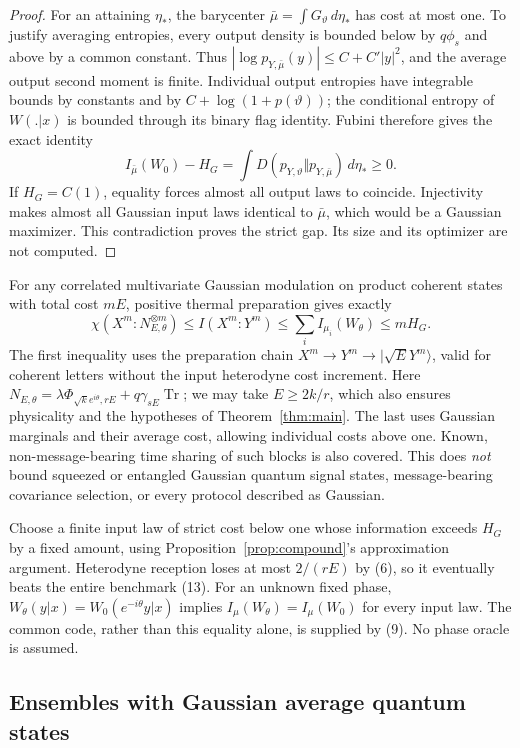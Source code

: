 \documentclass[11pt]{article}
\newcommand{\Tr}{\operatorname{Tr}}
\begin{document}
\begin{proof}
For an attaining \(\eta_*\), the barycenter
\(\bar\mu=\int G_\vartheta\,d\eta_*\) has cost at most one.
To justify averaging entropies, every output density is bounded below by
\(q\phi_s\) and above by a common constant. Thus
\(|\log p_{Y,\bar\mu}(y)|\leq C+C'|y|^2\), and the average output
second moment is finite. Individual output entropies have integrable
bounds by constants and by \(C+\log(1+p(\vartheta))\); the conditional
entropy of \(W(.|x)\) is bounded through its binary flag identity.
Fubini therefore gives the exact identity
\[
 I_{\bar\mu}(W_0)-H_G
   =\int D(p_{Y,\vartheta}\Vert p_{Y,\bar\mu})\,d\eta_*\geq0 .
\]
If \(H_G=C(1)\), equality forces almost all output laws to coincide.
Injectivity makes almost all Gaussian input laws identical to
\(\bar\mu\), which would be a Gaussian maximizer. This contradiction
proves the strict gap. Its size and its optimizer are not computed.
\end{proof}

For any correlated multivariate Gaussian modulation on product coherent
states with total cost \(mE\), positive thermal preparation gives exactly
\[
 \chi(X^m:N_{E,\theta}^{\otimes m})
 \leq I(X^m:Y^m)\leq\sum_i I_{\mu_i}(W_\theta)\leq mH_G.     \tag{13}
\]
The first inequality uses the preparation chain
\(X^m\to Y^m\to|\sqrt E Y^m\rangle\), valid for coherent letters
without the input heterodyne cost increment.
Here \(N_{E,\theta}=\lambda\Phi_{\sqrt k e^{i\theta},rE}
+q\gamma_{sE}\Tr\); we may take \(E\geq2k/r\), which also
ensures physicality and the hypotheses of Theorem~\ref{thm:main}.
The last uses Gaussian marginals and their average cost, allowing
individual costs above one. Known, non-message-bearing time sharing of
such blocks is also covered. This does \emph{not} bound squeezed or
entangled Gaussian quantum signal states, message-bearing covariance
selection, or every protocol described as Gaussian.

Choose a finite input law of strict cost below one whose information
exceeds \(H_G\) by a fixed amount, using Proposition~\ref{prop:compound}'s
approximation argument. Heterodyne reception loses at most \(2/(rE)\)
by (6), so it eventually beats the entire benchmark (13).
For an unknown fixed phase,
\(W_\theta(y|x)=W_0(e^{-i\theta}y|x)\) implies
\(I_\mu(W_\theta)=I_\mu(W_0)\) for every input law.
The common code, rather than this equality alone, is supplied by (9).
No phase oracle is assumed.

\subsection{Ensembles with Gaussian average quantum states}
\end{document}
